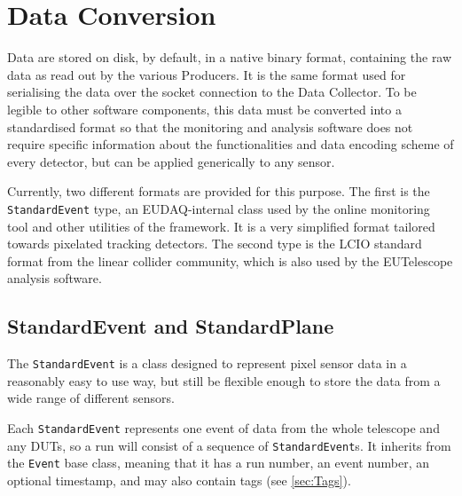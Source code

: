 \section{Data Conversion}
Data are stored on disk, by default, in a native binary format, containing the raw data as read out by the various Producers.
It is the same format used for serialising the data over the socket connection to the Data Collector.
To be legible to other software components, this data must be converted into a standardised format so that the monitoring and analysis software
does not require specific information about the functionalities and data encoding scheme of every detector, but can be applied generically to any sensor.

Currently, two different formats are provided for this purpose.
The first is the \texttt{StandardEvent} type, an EUDAQ-internal class used by the online monitoring tool and other utilities of the framework. It is a very simplified format tailored towards pixelated tracking detectors.
The second type is the \gls{LCIO} standard format from the linear collider community,
which is also used by the EUTelescope analysis software.


\subsection{StandardEvent and StandardPlane}
The \texttt{StandardEvent} is a class designed to represent pixel sensor data in a reasonably easy to use way,
but still be flexible enough to store the data from a wide range of different sensors.

Each \texttt{StandardEvent} represents one event of data from the whole telescope and any \glspl{DUT},
so a run will consist of a sequence of \texttt{StandardEvent}s.
It inherits from the \texttt{Event} base class, meaning that it has a run number, an event number, an optional timestamp,
and may also contain tags (see \autoref{sec:Tags}).

